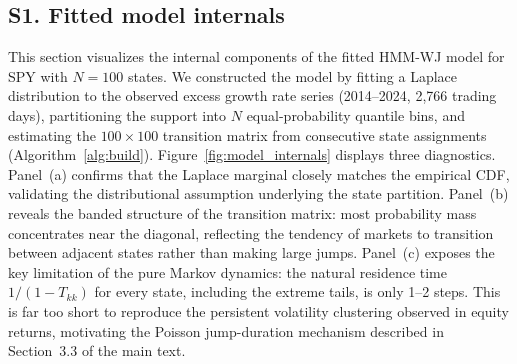 
\subsection*{S1. Fitted model internals}

This section visualizes the internal components of the fitted HMM-WJ model for SPY with $N=100$ states.
We constructed the model by fitting a Laplace distribution to the observed excess growth rate series (2014--2024, 2{,}766 trading days), partitioning the support into $N$ equal-probability quantile bins, and estimating the $100 \times 100$ transition matrix from consecutive state assignments (Algorithm~\ref{alg:build}).
Figure~\ref{fig:model_internals} displays three diagnostics.
Panel~(a) confirms that the Laplace marginal closely matches the empirical CDF, validating the distributional assumption underlying the state partition.
Panel~(b) reveals the banded structure of the transition matrix: most probability mass concentrates near the diagonal, reflecting the tendency of markets to transition between adjacent states rather than making large jumps.
Panel~(c) exposes the key limitation of the pure Markov dynamics: the natural residence time $1/(1-T_{kk})$ for every state, including the extreme tails, is only 1--2 steps.
This is far too short to reproduce the persistent volatility clustering observed in equity returns, motivating the Poisson jump-duration mechanism described in Section~3.3 of the main text.

